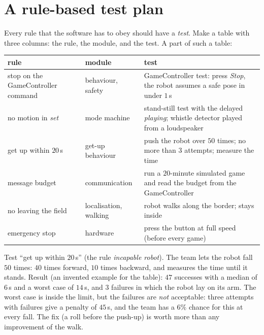 \section*{A rule-based test plan}
Every rule that the software has to obey should have a \emph{test}. Make a table with three columns: the rule, the module, and the test. A part of such a table:

\begin{center}
\small
\begin{tabular}{p{4.2cm}p{3.2cm}p{5.3cm}}
\hline
rule & module & test\\
\hline
stop on the GameController command & behaviour, safety & GameController test: press \emph{Stop}, the robot assumes a safe pose in under $1$\,s\\
no motion in \emph{set} & mode machine & stand-still test with the delayed \emph{playing}; whistle detector played from a loudspeaker\\
get up within $20$\,s & get-up behaviour & push the robot over $50$ times; no more than $3$ attempts; measure the time\\
message budget & communication & run a $20$-minute simulated game and read the budget from the GameController\\
no leaving the field & localisation, walking & robot walks along the border; stays inside\\
emergency stop & hardware & press the button at full speed (before every game)\\
\hline
\end{tabular}
\end{center}

\begin{example}
Test ``get up within $20$\,s'' (the rule \emph{incapable robot}). The team lets the robot fall $50$ times: $40$ times forward, $10$ times backward, and measures the time until it stands. Result (an invented example for the table): $47$ successes with a median of $6$\,s and a worst case of $14$\,s, and $3$ failures in which the robot lay on its arm. The worst case is inside the limit, but the failures are \emph{not} acceptable: three attempts with failures give a penalty of $45$\,s, and the team has a $6\%$ chance for this at every fall. The fix (a roll before the push-up) is worth more than any improvement of the walk.
\end{example}

